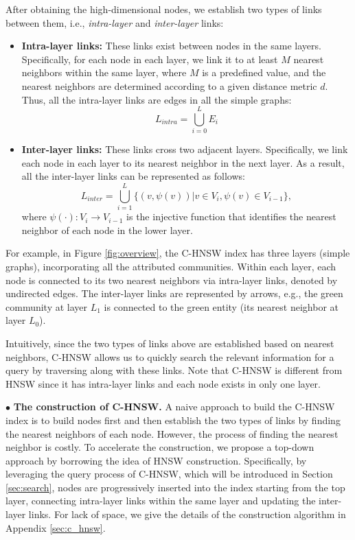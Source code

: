 After obtaining the high-dimensional nodes, we establish two types of links between them, i.e., {\it intra-layer} and {\it inter-layer} links:
%
\begin{itemize}
    \item {\bf Intra-layer links:} These links exist between nodes in the same layers. Specifically, for each node in each layer, we link it to at least $M$ nearest neighbors within the same layer, where $M$ is a predefined value, and the nearest neighbors are determined according to a given distance metric $d$.
    Thus, all the intra-layer links are edges in all the simple graphs:
    \begin{equation}
        L_{intra}=\bigcup_{i=0}^{L}E_i
    \end{equation}

    \item {\bf Inter-layer links:} These links cross two adjacent layers. Specifically, we link each node in each layer to its nearest neighbor in the next layer. As a result, all the inter-layer links can be represented as follows:
        \begin{equation}
            L_{inter} = \bigcup_{i=1}^{L} \{(v,\psi(v))|v \in V_i,\psi(v)\in V_{i-1} \},
        \end{equation}
        where $\psi(\cdot):V_i \rightarrow V_{i-1}$ is the injective function that identifies the nearest neighbor of each node in the lower layer.
\end{itemize}

For example, in Figure \ref{fig:overview}, the C-HNSW index has three layers (simple graphs), incorporating all the attributed communities.
%
Within each layer, each node is connected to its two nearest neighbors via intra-layer links, denoted by undirected edges.
%
The inter-layer links are represented by arrows, e.g., the green community at layer $L_1$ is connected to the green entity (its nearest neighbor at layer $L_0$).

Intuitively, since the two types of links above are established based on nearest neighbors, C-HNSW allows us to quickly search the relevant information for a query by traversing along with these links.
%
Note that C-HNSW is different from HNSW since it has intra-layer links and each node exists in only one layer.

$\bullet$ \textbf{The construction of C-HNSW.}
A naive approach to build the C-HNSW index is to build nodes first and then establish the two types of links by finding the nearest neighbors of each node.
%
However, the process of finding the nearest neighbor is costly.
%
To accelerate the construction, we propose a top-down approach by borrowing the idea of HNSW construction.
% 
Specifically, by leveraging the query process of C-HNSW, which will be introduced in Section \ref{sec:search}, nodes are progressively inserted into the index starting from the top layer, connecting intra-layer links within the same layer and updating the inter-layer links.
%
For lack of space, we give the details of the construction algorithm in Appendix \ref{sec:c_hnsw}.



